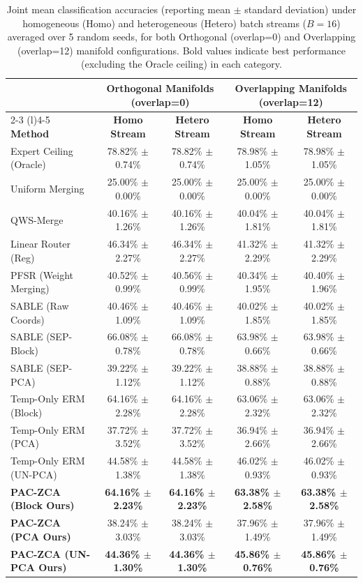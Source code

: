 \begin{table}[htbp]
\caption{Joint mean classification accuracies (reporting mean $\pm$ standard deviation) under homogeneous (Homo) and heterogeneous (Hetero) batch streams ($B=16$) averaged over 5 random seeds, for both Orthogonal (overlap=0) and Overlapping (overlap=12) manifold configurations. Bold values indicate best performance (excluding the Oracle ceiling) in each category.}
\label{tab:main_results}
\centering
\begin{tabular}{lcccc}
\toprule
& \multicolumn{2}{c}{\textbf{Orthogonal Manifolds (overlap=0)}} & \multicolumn{2}{c}{\textbf{Overlapping Manifolds (overlap=12)}} \\
\cmidrule(r){2-3} \cmidrule(l){4-5}
\textbf{Method} & \textbf{Homo Stream} & \textbf{Hetero Stream} & \textbf{Homo Stream} & \textbf{Hetero Stream} \\
\midrule
Expert Ceiling (Oracle) & 78.82\% $\pm$ 0.74\% & 78.82\% $\pm$ 0.74\% & 78.98\% $\pm$ 1.05\% & 78.98\% $\pm$ 1.05\% \\
\midrule
Uniform Merging & 25.00\% $\pm$ 0.00\% & 25.00\% $\pm$ 0.00\% & 25.00\% $\pm$ 0.00\% & 25.00\% $\pm$ 0.00\% \\
QWS-Merge & 40.16\% $\pm$ 1.26\% & 40.16\% $\pm$ 1.26\% & 40.04\% $\pm$ 1.81\% & 40.04\% $\pm$ 1.81\% \\
Linear Router (Reg) & 46.34\% $\pm$ 2.27\% & 46.34\% $\pm$ 2.27\% & 41.32\% $\pm$ 2.29\% & 41.32\% $\pm$ 2.29\% \\
PFSR (Weight Merging) & 40.52\% $\pm$ 0.99\% & 40.56\% $\pm$ 0.99\% & 40.34\% $\pm$ 1.95\% & 40.40\% $\pm$ 1.96\% \\
SABLE (Raw Coords) & 40.46\% $\pm$ 1.09\% & 40.46\% $\pm$ 1.09\% & 40.02\% $\pm$ 1.85\% & 40.02\% $\pm$ 1.85\% \\
SABLE (SEP-Block) & 66.08\% $\pm$ 0.78\% & 66.08\% $\pm$ 0.78\% & 63.98\% $\pm$ 0.66\% & 63.98\% $\pm$ 0.66\% \\
SABLE (SEP-PCA) & 39.22\% $\pm$ 1.12\% & 39.22\% $\pm$ 1.12\% & 38.88\% $\pm$ 0.88\% & 38.88\% $\pm$ 0.88\% \\
Temp-Only ERM (Block) & 64.16\% $\pm$ 2.28\% & 64.16\% $\pm$ 2.28\% & 63.06\% $\pm$ 2.32\% & 63.06\% $\pm$ 2.32\% \\
Temp-Only ERM (PCA) & 37.72\% $\pm$ 3.52\% & 37.72\% $\pm$ 3.52\% & 36.94\% $\pm$ 2.66\% & 36.94\% $\pm$ 2.66\% \\
Temp-Only ERM (UN-PCA) & 44.58\% $\pm$ 1.38\% & 44.58\% $\pm$ 1.38\% & 46.02\% $\pm$ 0.93\% & 46.02\% $\pm$ 0.93\% \\
\midrule
\textbf{PAC-ZCA (Block Ours)} & \textbf{64.16\% $\pm$ 2.23\%} & \textbf{64.16\% $\pm$ 2.23\%} & \textbf{63.38\% $\pm$ 2.58\%} & \textbf{63.38\% $\pm$ 2.58\%} \\
\textbf{PAC-ZCA (PCA Ours)} & 38.24\% $\pm$ 3.03\% & 38.24\% $\pm$ 3.03\% & 37.96\% $\pm$ 1.49\% & 37.96\% $\pm$ 1.49\% \\
\textbf{PAC-ZCA (UN-PCA Ours)} & \textbf{44.36\% $\pm$ 1.30\%} & \textbf{44.36\% $\pm$ 1.30\%} & \textbf{45.86\% $\pm$ 0.76\%} & \textbf{45.86\% $\pm$ 0.76\%} \\
\bottomrule
\end{tabular}
\end{table}

